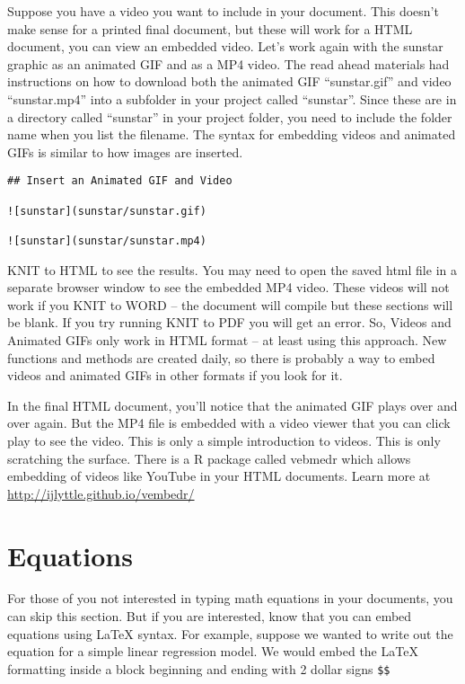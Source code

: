 \documentclass[]{book}
\theoremstyle{definition}
\theoremstyle{definition}
\theoremstyle{definition}
\theoremstyle{remark}
\begin{document}
Suppose you have a video you want to include in your document. This
doesn't make sense for a printed final document, but these will work for
a HTML document, you can view an embedded video. Let's work again with
the sunstar graphic as an animated GIF and as a MP4 video. The read
ahead materials had instructions on how to download both the animated
GIF ``sunstar.gif'' and video ``sunstar.mp4'' into a subfolder in your
project called ``sunstar''. Since these are in a directory called
``sunstar'' in your project folder, you need to include the folder name
when you list the filename. The syntax for embedding videos and animated
GIFs is similar to how images are inserted.

\begin{verbatim}
## Insert an Animated GIF and Video

![sunstar](sunstar/sunstar.gif)

![sunstar](sunstar/sunstar.mp4)
\end{verbatim}

KNIT to HTML to see the results. You may need to open the saved html
file in a separate browser window to see the embedded MP4 video. These
videos will not work if you KNIT to WORD -- the document will compile
but these sections will be blank. If you try running KNIT to PDF you
will get an error. So, Videos and Animated GIFs only work in HTML format
-- at least using this approach. New functions and methods are created
daily, so there is probably a way to embed videos and animated GIFs in
other formats if you look for it.

In the final HTML document, you'll notice that the animated GIF plays
over and over again. But the MP4 file is embedded with a video viewer
that you can click play to see the video. This is only a simple
introduction to videos. This is only scratching the surface. There is a
R package called vebmedr which allows embedding of videos like YouTube
in your HTML documents. Learn more at
\url{http://ijlyttle.github.io/vembedr/}

\section{Equations}\label{equations}

For those of you not interested in typing math equations in your
documents, you can skip this section. But if you are interested, know
that you can embed equations using LaTeX syntax. For example, suppose we
wanted to write out the equation for a simple linear regression model.
We would embed the LaTeX formatting inside a block beginning and ending
with 2 dollar signs \texttt{\$\$}
\end{document}
